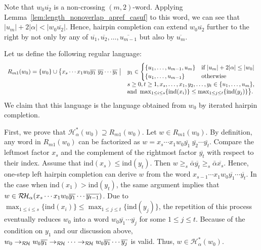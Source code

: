 \documentclass{article}
\theoremstyle{plain}
\theoremstyle{remark}
\newcommand{\RHC}{\ensuremath{\mathcal{R\hspace*{-0.5mm}H}}}
\newcommand{\HC}{\ensuremath{\mathcal{H}}}
\newcommand{\ind}{\ensuremath{\mathrm{ind}}}
\begin{document}
Note that $w_0 \overline{u_2}$ is a non-crossing $(m, 2)$-word. 
Applying Lemma~\ref{lem:length_nonoverlap_apref_casuf} to this word, we can see that $|u_m| + 2|\alpha| < |w_0 \overline{u_2}|$. 
Hence, hairpin completion can extend $w_0 \overline{u_2}$ further to the right by not only by any of $\overline{u_1}, \overline{u_2}, \ldots, \overline{u_{m-1}}$ but also by $\overline{u_m}$. 

Let us define the following regular language: 
\[
\begin{array}{ll}
	R_{m1}(w_0) = \{w_0\} \cup \bigl\{x_s \cdots x_1 w_0 \overline{y_1} \ \overline{y_2} \cdots \overline{y_t} \bigm|
		& y_1 \in \begin{cases}
			\{u_1, \ldots, u_{m-1}, u_m\} 	& \text{if $|u_m| + 2|\alpha| \le |w_0|$} \\
			\{u_1, \ldots, u_{m-1}\}	& \text{otherwise} 
			\end{cases} \\
		& s \ge 0, t \ge 1, x_s, \ldots, x_1, y_2, \ldots, y_t \in \{u_1, \ldots, u_m\}, \\
		& \mbox{and } \max_{1 \le i \le s}\{\ind(x_i)\} \le \max_{1 \le j \le t}\{\ind(y_j)\} \bigr\}. \\
\end{array}
\]
We claim that this language is the language obtained from $w_0$ by iterated hairpin completion. 

First, we prove that $\HC_\alpha^*(w_0) \supseteq R_{m1}(w_0)$. 
Let $w \in R_{m1}(w_0)$. 
By definition, any word in $R_{m1}(w_0)$ can be factorized as $w = x_s \cdots x_1 w_0 \overline{y_1} \ \overline{y_2} \cdots \overline{y_t}$. 
Compare the leftmost factor $x_s$ and the complement of the rightmost factor $\overline{y_t}$ with respect to their index. 
Assume that $\ind(x_s) \le \ind(y_t)$. 
Then $w \ge_s \bar{\alpha} \overline{y_t} \ge_s \bar{\alpha} \overline{x_s}$. 
Hence, one-step left hairpin completion can derive $w$ from the word $x_{s-1} \cdots x_1 w_0 \overline{y_1} \cdots \overline{y_t}$. 
In the case when $\ind(x_1) > \ind(y_t)$, the same argument implies that $w \in \RHC_\alpha(x_s \cdots x_1 w_0 \overline{y_1} \cdots \overline{y_{t-1}})$. 
Due to $\max_{1 \le i \le s}\{\ind(x_i)\} \le \max_{1 \le j \le t}\{\ind(y_j)\}$, the repetition of this process eventually reduces $w_0$ into a word $w_0 \overline{y_1} \cdots \overline{y_j}$ for some $1 \le j \le t$. 
Because of the condition on $y_1$ and our discussion above, $w_0 \to_{\RHC} w_0 \overline{y_1} \to_{\RHC} \cdots \to_{\RHC} w_0 \overline{y_1} \cdots \overline{y_j}$ is valid. 
Thus, $w \in \HC_\alpha^*(w_0)$. 
\end{document}
